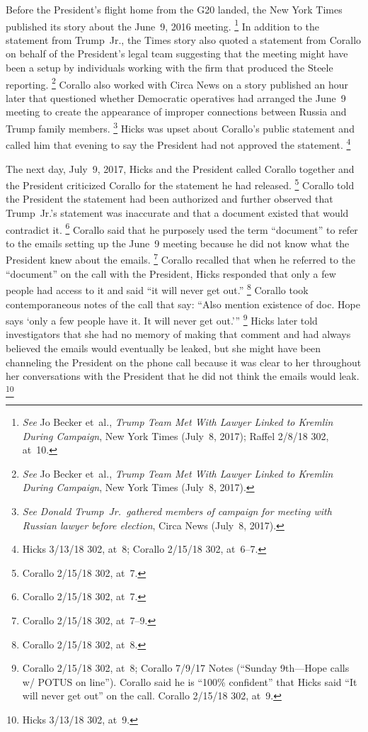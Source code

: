 Before the President's flight home from the G20 landed, the New York Times published its story about the June~9, 2016 meeting.%
\footnote{\textit{See} Jo Becker et~al., \textit{Trump Team Met With Lawyer Linked to Kremlin During Campaign}, New York Times (July~8, 2017);
Raffel 2/8/18 302, at~10.}
In addition to the statement from Trump~Jr., the Times story also quoted a statement from Corallo on behalf of the President's legal team suggesting that the meeting might have been a setup by individuals working with the firm that produced the Steele reporting.%
\footnote{\textit{See} Jo Becker et~al., \textit{Trump Team Met With Lawyer Linked to Kremlin During Campaign}, New York Times (July~8, 2017).}
Corallo also worked with Circa News on a story published an hour later that questioned whether Democratic operatives had arranged the June~9 meeting to create the appearance of improper connections between Russia and Trump family members.%
\footnote{\textit{See Donald Trump~Jr.\ gathered members of campaign for meeting with Russian lawyer before election}, Circa News (July~8, 2017).}
Hicks was upset about Corallo's public statement and called him that evening to say the President had not approved the statement.%
\footnote{Hicks 3/13/18 302, at~8;
Corallo 2/15/18 302, at~6--7.}

The next day, July~9, 2017, Hicks and the President called Corallo together and the President criticized Corallo for the statement he had released.%
\footnote{Corallo 2/15/18 302, at~7.}
Corallo told the President the statement had been authorized and further observed that Trump~Jr.'s statement was inaccurate and that a document existed that would contradict it.%
\footnote{Corallo 2/15/18 302, at~7.}
Corallo said that he purposely used the term ``document'' to refer to the emails setting up the June~9 meeting because he did not know what the President knew about the emails.%
\footnote{Corallo 2/15/18 302, at~7--9.}
Corallo recalled that when he referred to the ``document'' on the call with the President, Hicks responded that only a few people had access to it and said ``it will never get out.''%
\footnote{Corallo 2/15/18 302, at~8.}
Corallo took contemporaneous notes of the call that say:
``Also mention existence of doc.
Hope says `only a few people have it.
It will never get out.'\thinspace''%
\footnote{Corallo 2/15/18 302, at~8;
Corallo 7/9/17 Notes (``Sunday 9th---Hope calls w/ POTUS on line'').
Corallo said he is ``100\% confident'' that Hicks said ``It will never get out'' on the call.
Corallo 2/15/18 302, at~9.}
Hicks later told investigators that she had no memory of making that comment and had always believed the emails would eventually be leaked, but she might have been channeling the President on the phone call because it was clear to her throughout her conversations with the President that he did not think the emails would leak.%
\footnote{Hicks 3/13/18 302, at~9.}

